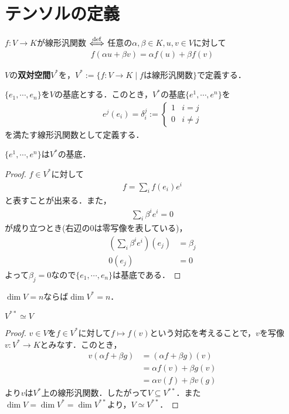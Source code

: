 \documentclass[uplatex]{jsarticle}
\begin{document}
\fi

\section{テンソルの定義}
\begin{teigi}[線形汎関数]
  $f\colon V\to K$が線形汎関数 $\overset{\mathrm{def}}{\Longleftrightarrow}$ 任意の$\alpha,\beta \in K, u,v \in V$に対して
  \begin{align*}
    f(\alpha u+\beta v) = \alpha f(u) + \beta f(v)
  \end{align*}
\end{teigi}
\begin{teigi}[双対空間]
  $V$の\textbf{双対空間}$V^\ast$を，$V^\ast := \{ f\colon V\to K \mid fは線形汎関数 \}$で定義する．
\end{teigi}
\begin{teigi}[双対基底]
  $\{e_1,\cdots,e_n\}$を$V$の基底とする．このとき，$V^\ast$の基底$\{e^1,\cdots,e^n\}$を
  \begin{align*}
    e^j(e_i) = \delta_i^j := \begin{cases}
      1 & i=j \\
      0 & i\neq j
    \end{cases}
  \end{align*}
  を満たす線形汎関数として定義する．
\end{teigi}
\begin{prop}
  $\{e^1,\cdots,e^n\}$は$V^\ast$の基底．
\end{prop}
\begin{proof}
  $f\in V^\ast$に対して
  \begin{align*}
    f = \sum_i f(e_i) e^i
  \end{align*}
  と表すことが出来る．また，
  \begin{align*}
    \sum_i \beta^i e^i = 0
  \end{align*}
  が成り立つとき(右辺の0は零写像を表している)，
  \begin{align*}
    \left(\sum_i \beta^i e^i \right) (e_j) & = \beta_j \\
    0(e_j) & = 0 
  \end{align*}
  よって$\beta_j = 0$なので$\{e_1,\cdots,e_n\}$は基底である．
\end{proof}
\begin{corr}
  $\dim V = n$ならば$\dim V^\ast = n$．
\end{corr}
\begin{prop}
  $V^{\ast \ast} \simeq V$
\end{prop}
\begin{proof}
  $v\in V$を$f\in V^\ast$に対して$f\mapsto f(v)$という対応を考えることで，$v$を写像$v\colon V^\ast \to K$とみなす．このとき，
  \begin{align*}
    v(\alpha f + \beta g) & = (\alpha f + \beta g)(v) \\
    & = \alpha f(v) + \beta g(v) \\
    & = \alpha v(f) + \beta v(g)
  \end{align*}
  より$v$は$V^\ast$上の線形汎関数．したがって$V\subseteq V^{\ast \ast}$．また$\dim V = \dim V^\ast = \dim V^{\ast \ast}$より，$V \simeq V^{\ast \ast}$．
\end{proof}
\end{document}
